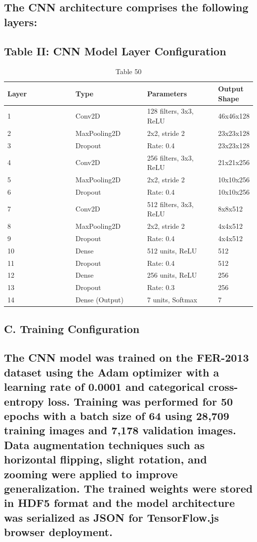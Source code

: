 \documentclass[conference]{IEEEtran}
\begin{document}
\subsection{The CNN architecture comprises the following layers:}
\subsection{Table II: CNN Model Layer Configuration}
\begin{table}[t]
\centering
\caption{Table 50}
\begin{tabular}{|p{0.3\linewidth}|p{0.3\linewidth}|p{0.3\linewidth}|p{0.3\linewidth}|}
\hline
Layer & Type & Parameters & Output Shape \\
\hline
1 & Conv2D & 128 filters, 3x3, ReLU & 46x46x128 \\
\hline
2 & MaxPooling2D & 2x2, stride 2 & 23x23x128 \\
\hline
3 & Dropout & Rate: 0.4 & 23x23x128 \\
\hline
4 & Conv2D & 256 filters, 3x3, ReLU & 21x21x256 \\
\hline
5 & MaxPooling2D & 2x2, stride 2 & 10x10x256 \\
\hline
6 & Dropout & Rate: 0.4 & 10x10x256 \\
\hline
7 & Conv2D & 512 filters, 3x3, ReLU & 8x8x512 \\
\hline
8 & MaxPooling2D & 2x2, stride 2 & 4x4x512 \\
\hline
9 & Dropout & Rate: 0.4 & 4x4x512 \\
\hline
10 & Dense & 512 units, ReLU & 512 \\
\hline
11 & Dropout & Rate: 0.4 & 512 \\
\hline
12 & Dense & 256 units, ReLU & 256 \\
\hline
13 & Dropout & Rate: 0.3 & 256 \\
\hline
14 & Dense (Output) & 7 units, Softmax & 7 \\
\hline
\end{tabular}
\end{table}
\subsection{C. Training Configuration}
\subsection{The CNN model was trained on the FER-2013 dataset using the Adam optimizer with a learning rate of 0.0001 and categorical cross-entropy loss. Training was performed for 50 epochs with a batch size of 64 using 28,709 training images and 7,178 validation images. Data augmentation techniques such as horizontal flipping, slight rotation, and zooming were applied to improve generalization. The trained weights were stored in HDF5 format and the model architecture was serialized as JSON for TensorFlow.js browser deployment.}
\end{document}

